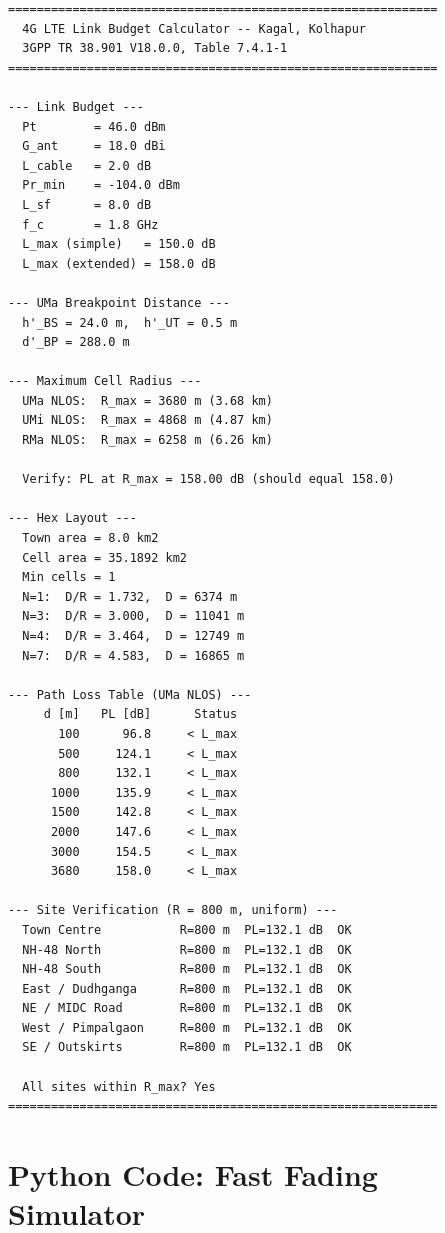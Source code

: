 \documentclass[10pt,a4paper,twocolumn]{article}
\begin{document}
\begin{lstlisting}[style=outputstyle]
============================================================
  4G LTE Link Budget Calculator -- Kagal, Kolhapur
  3GPP TR 38.901 V18.0.0, Table 7.4.1-1
============================================================

--- Link Budget ---
  Pt        = 46.0 dBm
  G_ant     = 18.0 dBi
  L_cable   = 2.0 dB
  Pr_min    = -104.0 dBm
  L_sf      = 8.0 dB
  f_c       = 1.8 GHz
  L_max (simple)   = 150.0 dB
  L_max (extended) = 158.0 dB

--- UMa Breakpoint Distance ---
  h'_BS = 24.0 m,  h'_UT = 0.5 m
  d'_BP = 288.0 m

--- Maximum Cell Radius ---
  UMa NLOS:  R_max = 3680 m (3.68 km)
  UMi NLOS:  R_max = 4868 m (4.87 km)
  RMa NLOS:  R_max = 6258 m (6.26 km)

  Verify: PL at R_max = 158.00 dB (should equal 158.0)

--- Hex Layout ---
  Town area = 8.0 km2
  Cell area = 35.1892 km2
  Min cells = 1
  N=1:  D/R = 1.732,  D = 6374 m
  N=3:  D/R = 3.000,  D = 11041 m
  N=4:  D/R = 3.464,  D = 12749 m
  N=7:  D/R = 4.583,  D = 16865 m

--- Path Loss Table (UMa NLOS) ---
     d [m]   PL [dB]      Status
       100      96.8     < L_max
       500     124.1     < L_max
       800     132.1     < L_max
      1000     135.9     < L_max
      1500     142.8     < L_max
      2000     147.6     < L_max
      3000     154.5     < L_max
      3680     158.0     < L_max

--- Site Verification (R = 800 m, uniform) ---
  Town Centre           R=800 m  PL=132.1 dB  OK
  NH-48 North           R=800 m  PL=132.1 dB  OK
  NH-48 South           R=800 m  PL=132.1 dB  OK
  East / Dudhganga      R=800 m  PL=132.1 dB  OK
  NE / MIDC Road        R=800 m  PL=132.1 dB  OK
  West / Pimpalgaon     R=800 m  PL=132.1 dB  OK
  SE / Outskirts        R=800 m  PL=132.1 dB  OK

  All sites within R_max? Yes
============================================================
\end{lstlisting}

\section{Python Code: Fast Fading Simulator}
\label{sec:code_part2}


\end{document}
